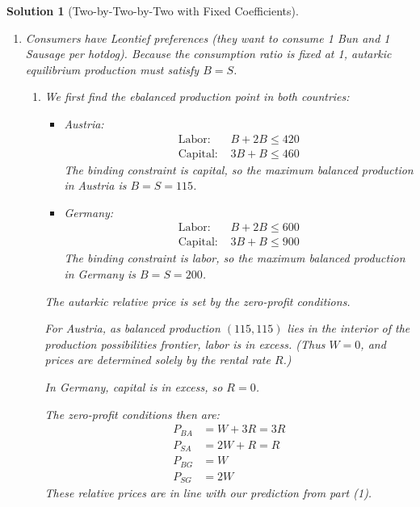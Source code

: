 \documentclass[a4paper,12pt]{article} %
\theoremstyle{nonitalic}
\newtheorem{solution}{Solution}
\begin{document}
\begin{solution}[Two-by-Two-by-Two with Fixed Coefficients]
\begin{enumerate}
        \item[3.] Consumers have Leontief preferences (they want to consume 1 Bun and 1 Sausage per hotdog). Because the consumption ratio is fixed at 1, autarkic equilibrium production must satisfy $B=S$.
            \begin{enumerate}
                \item[(a)] We first find the ebalanced production point in both countries:
                    \begin{itemize}
                        \item Austria: 
                            \begin{align*}
                                \text{Labor: } & B + 2B \leq 420 \\
                                \text{Capital: } & 3B + B \leq 460
                            \end{align*}
                            The binding constraint is capital, so the maximum balanced production in Austria is $B = S = 115$.
                        \item Germany:
                            \begin{align*}
                                \text{Labor: } & B + 2B \leq 600 \\
                                \text{Capital: } & 3B + B \leq 900
                            \end{align*}
                            The binding constraint is labor, so the maximum balanced production in Germany is $B = S = 200$.
                    \end{itemize}
                    The autarkic relative price is set by the zero-profit conditions.

                    For Austria, as balanced production $(115, 115)$ lies in the interior of the production possibilities frontier, labor is in excess. (Thus $W = 0$, and prices are determined solely by the rental rate $R$.)

                    In Germany, capital is in excess, so $R = 0$.

                    The zero-profit conditions then are:
                        \begin{align*}
                            P_{BA} &= W + 3R = 3R \\
                            P_{SA} &= 2W + R = R \\
                            P_{BG} &= W \\
                            P_{SG} &= 2W
                        \end{align*}
                    These relative prices are in line with our prediction from part (1).


\end{enumerate}
\end{enumerate}
\end{solution}
\end{document}
